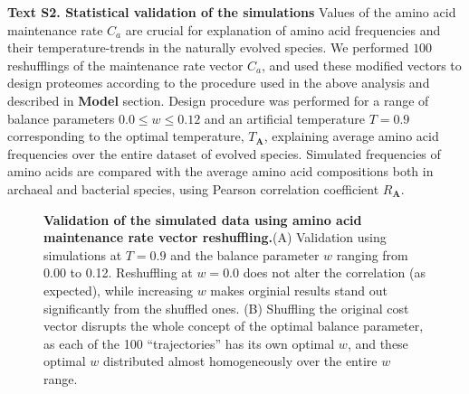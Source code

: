 \documentclass{report}
\begin{document}
{\bf Text S2. Statistical validation of the simulations}
Values of the amino acid maintenance rate $C_{a}$ are crucial for explanation of amino acid frequencies and their temperature-trends in the naturally evolved species. We performed $100$ reshufflings of the maintenance rate vector $C_{a}$, and used these modified vectors to design proteomes according to the procedure used in the above analysis and described in {\bf Model} section. Design procedure was performed for a range of balance parameters $0.0\leq\mathit{w}\leq0.12$ and an artificial temperature $T=0.9$ corresponding to the optimal temperature, $T_{\mathbf{A}}$, explaining average amino acid frequencies over the entire dataset of evolved species. Simulated frequencies of amino acids are compared with the average amino acid compositions both in archaeal and bacterial species, using Pearson correlation coefficient $R_{\mathbf{A}}$. 

\begin{figure}[h!]
	\centering
	\qquad
	\caption{
	{\bf Validation of the simulated data using amino acid maintenance rate vector reshuffling.}(A) Validation using simulations at $T=0.9$ and the balance parameter $w$ ranging from 0.00 to 0.12. Reshuffling at $w=0.0$ does not alter the correlation (as expected), while increasing $w$ makes orginial results stand out significantly from the shuffled ones. (B) Shuffling the original cost vector disrupts the whole concept of the optimal balance parameter, as each of the 100 “trajectories” has its own optimal $w$, and these optimal $w$ distributed almost homogeneously over the entire $w$ range.
}
\end{figure}
\end{document}
